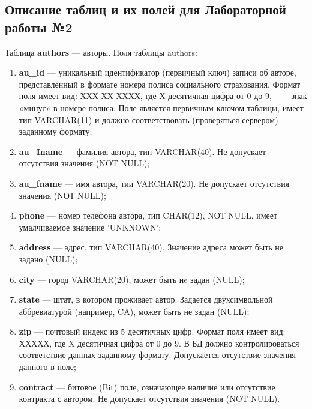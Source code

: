 \subsection{\centering Описание таблиц и их полей для Лабораторной работы №2}

Таблица \textbf{authors} — авторы. Поля таблицы authors:
\begin{enumerate}
\label{DB2INFO}
\item \textbf{au\_id} — уникальный идентификатор (первичный ключ) записи об авторе, представленный в формате номера полиса социального страхования. Формат поля имеет вид: ХХХ-ХХ-ХХХХ, где Х десятичная цифра от 0 до 9, - — знак «минус» в номере полиса. Поле является первичным ключом таблицы, имеет тип VARCHAR(11) и должно соответствовать (проверяться сервером) заданному формату;

\item \textbf{au\_Iname} — фамилия автора, тип VARCHAR(40). Не допускает отсутствия значения (NOT NULL);

\item \textbf{au\_fname} — имя автора, тии VARCHAR(20). Не допускает отсутствия значения (NОТ NULL);

\item \textbf{phone} — номер телефона автора, тип CHAR(12), NОТ NULL, имеет умалчиваемое значение 'UNKNOWN';

\item \textbf{address} — адрес, тип VARCHAR(40). Значение адреса может быть не задано
(NULL);

\item \textbf{city} — город VARCHAR(20), может быть нe задан (NULL);

\item \textbf{state} — штат, в котором проживает автор. Задается двухсимвольной аббревиатурой (например, CA), может быть не задан (NULL);

\item \textbf{zip} — почтовый индекс из 5 десятичных цифр. Формат поля имеет вид: ХХХХХ, где X десятичная цифра от 0 до 9. В БД должно контролироваться соответствие данных заданному формату. Допускается отсутствие значения данного в поле;

\item \textbf{contract} — битовое (Bit) поле, означающее наличие или отсутствие контракта с автором. Не допускает отсутствия значения (NOT NULL).
\end{enumerate}

